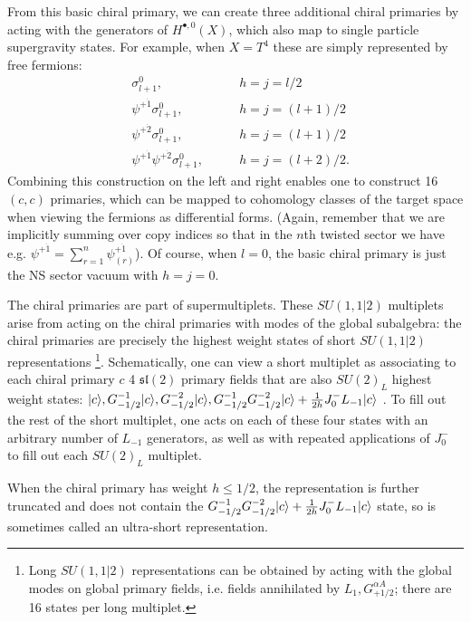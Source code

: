 \documentclass[../main.tex]{subfiles}
\begin{document}
From this basic chiral primary, we can create three additional chiral primaries by acting with the generators of $H^{\bullet, 0}(X)$, which also map to single particle supergravity states. For example, when $X=T^4$ these are simply represented by free fermions:
\begin{align*}
&\sigma^0_{l+1},  &\qquad h=j= l/2 \\
&\psi^{+ \dot{1}}\sigma^0_{l+1}, &\qquad h=j= (l+1)/2\\
&\psi^{+ \dot{2}}\sigma^0_{l+1} , &\qquad h=j= (l+1)/2\\
&\psi^{+ \dot{1}}\psi^{+ \dot{2}}\sigma^0_{l+1},   &\qquad h=j= (l+2)/2.
\end{align*}
Combining this construction on the left and right enables one to construct 16 $(c,c)$ primaries, which can be mapped to cohomology classes of the target space when viewing the fermions as differential forms. (Again, remember that we are implicitly summing over copy indices so that in the $n$th twisted sector we have e.g. $\psi^{+ \dot{1}} = \sum_{r=1}^n \psi^{+ \dot{1}}_{(r)}$). Of course, when $l=0$, the basic chiral primary is just the NS sector vacuum with $h=j=0$. 

The chiral primaries are part of supermultiplets. These $SU(1,1|2)$ multiplets arise from acting on the chiral primaries with modes of the global subalgebra: the chiral primaries are precisely the highest weight states of short $SU(1,1|2)$ representations \footnote{Long $SU(1,1|2)$ representations can be obtained by acting with the global modes on global primary fields, i.e. fields annihilated by $L_1, G^{\alpha A}_{+1/2}$; there are 16 states per long multiplet.}. Schematically, one can view a short multiplet as associating to each chiral primary $c$ 4 $\mathfrak{sl}(2)$ primary fields that are also $SU(2)_L$ highest weight states: $|c \rangle, G^{- 1}_{-1/2}|c \rangle, G^{-2}_{-1/2}|c \rangle,  \\
G^{-1}_{-1/2}G^{-2}_{-1/2}|c \rangle + {1 \over 2h}J^-_0 L_{-1}|c\rangle$ . To fill out the rest of the short multiplet, one acts on each of these four states with an arbitrary number of $L_{-1}$ generators, as well as with repeated applications of $J_0^-$ to fill out each $SU(2)_L$ multiplet. 

When the chiral primary has weight $h \leq 1/2$, the representation is further truncated and does not contain the $G^{-1}_{-1/2}G^{-2}_{-1/2}|c \rangle + {1 \over 2h}J^-_0 L_{-1}|c\rangle$ state, so is sometimes called an ultra-short representation. 
\end{document}
